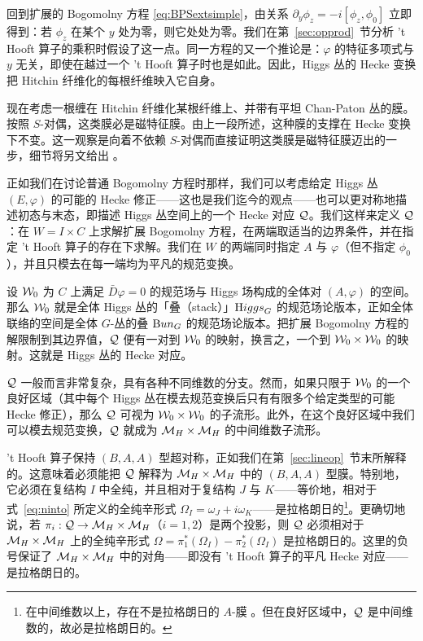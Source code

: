 回到扩展的 Bogomolny 方程 \eqref{eq:BPSextsimple}，由关系 $\partial_y\phi_z=-i[\phi_z,\phi_0]$ 立即得到：若 $\phi_z$ 在某个 $y$ 处为零，则它处处为零。我们在第~\ref{sec:opprod}~节分析 't Hooft 算子的乘积时假设了这一点。同一方程的又一个推论是：$\varphi$ 的特征多项式与 $y$ 无关，即使在越过一个 't Hooft 算子时也是如此。因此，Higgs 丛的 Hecke 变换把 Hitchin 纤维化的每根纤维映入它自身。

现在考虑一根缠在 Hitchin 纤维化某根纤维上、并带有平坦 Chan-Paton 丛的膜。按照 $S$-对偶，这类膜必是磁特征膜。由上一段所述，这种膜的支撑在 Hecke 变换下不变。这一观察是向着不依赖 $S$-对偶而直接证明这类膜是磁特征膜迈出的一步，细节将另文给出 \cite{ref26}。

\par{}

正如我们在讨论普通 Bogomolny 方程时那样，我们可以考虑给定 Higgs 丛 $(E,\varphi)$ 的可能的 Hecke 修正——这也是我们迄今的观点——也可以更对称地描述初态与末态，即描述 Higgs 丛空间上的一个 Hecke 对应 ${\EUQ}$。我们这样来定义 ${\EUQ}$：在 $W=I\times C$ 上求解扩展 Bogomolny 方程，在两端取适当的边界条件，并在指定 't Hooft 算子的存在下求解。我们在 $W$ 的两端同时指定 $A$ 与 $\varphi$（但不指定 $\phi_0$），并且只模去在每一端均为平凡的规范变换。

设 $\EUW_0$ 为 $C$ 上满足 $\bar D\varphi=0$ 的规范场与 Higgs 场构成的全体对 $(A,\varphi)$ 的空间。那么 $\EUW_0$ 就是全体 Higgs 丛的「叠（stack）」${\rm Higgs}_G$ 的规范场论版本，正如全体联络的空间是全体 $G$-丛的叠 ${\rm Bun}_G$ 的规范场论版本。把扩展 Bogomolny 方程的解限制到其边界值，${\EUQ}$ 便有一对到 $\EUW_0$ 的映射，换言之，一个到 $\EUW_0\times \EUW_0$ 的映射。这就是 Higgs 丛的 Hecke 对应。

${\EUQ}$ 一般而言非常复杂，具有各种不同维数的分支。然而，如果只限于 $\EUW_0$ 的一个良好区域（其中每个 Higgs 丛在模去规范变换后只有有限多个给定类型的可能 Hecke 修正），那么 ${\EUQ}$ 可视为 $\EUW_0\times \EUW_0$ 的子流形。此外，在这个良好区域中我们可以模去规范变换，${\EUQ}$ 就成为 $\MH\times\MH$ 的中间维数子流形。

't Hooft 算子保持 $(B,A,A)$ 型超对称，正如我们在第~\ref{sec:lineop}~节末所解释的。这意味着必须能把 ${\EUQ}$ 解释为 $\MH\times \MH$ 中的 $(B,A,A)$ 型膜。特别地，它必须在复结构 $I$ 中全纯，并且相对于复结构 $J$ 与 $K$——等价地，相对于式~\eqref{eq:ninto} 所定义的全纯辛形式 $\Omega_I=\omega_J+i\omega_K$——是拉格朗日的\footnote{在中间维数以上，存在不是拉格朗日的 $A$-膜 \cite{ref80}。但在良好区域中，${\EUQ}$ 是中间维数的，故必是拉格朗日的。}。更确切地说，若 $\pi_i:{\EUQ}\to\MH\times\MH$（$i=1,2$）是两个投影，则 ${\EUQ}$ 必须相对于 $\MH\times \MH$ 上的全纯辛形式 $\Omega=\pi_1^*(\Omega_I)-\pi_2^*(\Omega_I)$ 是拉格朗日的。这里的负号保证了 $\MH\times \MH$ 中的对角——即没有 't Hooft 算子的平凡 Hecke 对应——是拉格朗日的。

